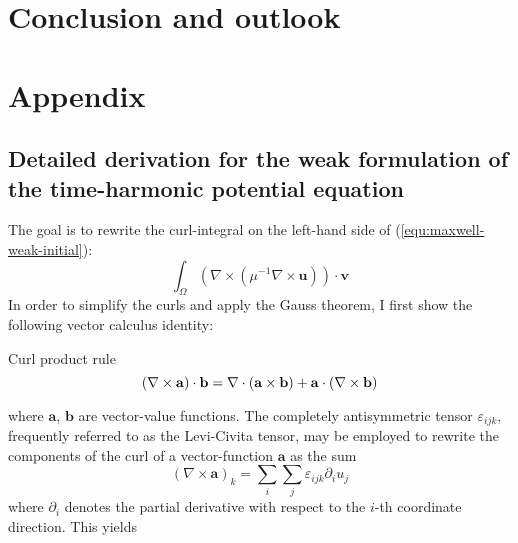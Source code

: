 \documentclass[11pt, a4paper]{article}
\begin{document}
\pagebreak
\section{Conclusion and outlook}
\label{sec:conclusion}

\pagebreak
\section{Appendix}
\label{sec:appendix}

\subsection{Detailed derivation for the weak formulation of the time-harmonic potential equation}
\label{subsec:derivation}

The goal is to rewrite the curl-integral on the left-hand side of 
(\ref{equ:maxwell-weak-initial}):
\begin{equation}
    \int_{\Omega} (\nabla \times (\mu^{-1} \nabla \times \mathbf{u})) \cdot \mathbf{v} \label{equ:maxwell-weak-initial-LHS}
\end{equation}
In order to simplify the curls and apply the Gauss theorem, I first show
the following vector calculus identity:
\begin{fancybox}{Curl product rule}
    \begin{equation}
        (\nabla \times \mathbf{a}) \cdot \mathbf{b} = \nabla \cdot (\mathbf{a} \times \mathbf{b}) + \mathbf{a} \cdot (\nabla \times \mathbf{b}) \label{equ:vector-calculus} \\
    \end{equation}
\end{fancybox}
where $\mathbf{a}$, $\mathbf{b}$ are vector-value functions. The completely
antisymmetric tensor $\varepsilon_{ijk}$, frequently referred to as the
Levi-Civita tensor, may be employed to rewrite the components of the
curl of a vector-function $\mathbf{a}$ as the sum
\begin{equation}
    (\nabla \times \mathbf{a})_k = \sum_i \sum_j \varepsilon_{ijk} \partial_i u_j
\end{equation}
where $\partial_i$ denotes the partial derivative with respect to the $i$-th coordinate
direction. This yields
\end{document}
